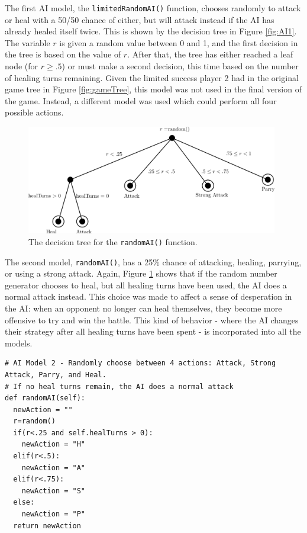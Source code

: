 The first AI model, the \texttt{limitedRandomAI()} function, chooses randomly to attack or heal with a 50/50 chance of either, but will attack instead if the AI has already healed itself twice. This is shown by the decision tree in Figure \ref{fig:AI1}. The variable $r$ is given a random value between 0 and 1, and the first decision in the tree is based on the value of $r$. After that, the tree has either reached a leaf node (for $r\ge .5$) or must make a second decision, this time based on the number of healing turns remaining. Given the limited success player 2 had in the original game tree in Figure \ref{fig:gameTree}, this model was not used in the final version of the game. Instead, a different model was used which could perform all four possible actions.\\

\begin{figure}[H]
  \centering
  \includegraphics[width=11cm]{figures/AIRandom.png}
  \caption{The decision tree for the \texttt{randomAI()} function.}
  \label{fig:AI2}
\end{figure}
The second model, \texttt{randomAI()}, has a 25\% chance of attacking, healing, parrying, or using a strong attack. Again, Figure \ref{fig:AI2} shows that if the random number generator chooses to heal, but all healing turns have been used, the AI does a normal attack instead. This choice was made to affect a sense of desperation in the AI: when an opponent no longer can heal themselves, they become more offensive to try and win the battle. This kind of behavior - where the AI changes their strategy after all healing turns have been spent - is incorporated into all the models.\\

\begin{lstlisting}
# AI Model 2 - Randomly choose between 4 actions: Attack, Strong Attack, Parry, and Heal.
# If no heal turns remain, the AI does a normal attack
def randomAI(self):
  newAction = ""
  r=random()
  if(r<.25 and self.healTurns > 0):
    newAction = "H"
  elif(r<.5):
    newAction = "A"
  elif(r<.75):
    newAction = "S"
  else:
    newAction = "P"
  return newAction
\end{lstlisting}

